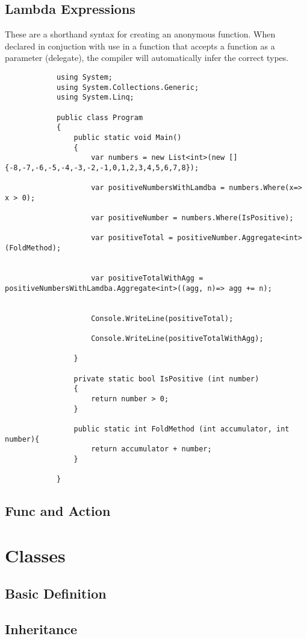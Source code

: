 \documentclass {amsart}
\begin{document}
	\subsection{Lambda Expressions}  These are a shorthand syntax for creating an anonymous function.  When declared in conjuction with use in a function that accepts a function as a parameter (delegate), the compiler will automatically infer the correct types. 
	\begin{lstlisting}
			using System;
			using System.Collections.Generic;
			using System.Linq;
			
			public class Program
			{
				public static void Main()
				{
					var numbers = new List<int>(new [] {-8,-7,-6,-5,-4,-3,-2,-1,0,1,2,3,4,5,6,7,8});
			
					var positiveNumbersWithLamdba = numbers.Where(x=> x > 0);
			
					var positiveNumber = numbers.Where(IsPositive);
					
					var positiveTotal = positiveNumber.Aggregate<int>(FoldMethod);
			
			
					var positiveTotalWithAgg = positiveNumbersWithLamdba.Aggregate<int>((agg, n)=> agg += n);
			
					
					Console.WriteLine(positiveTotal);
					
					Console.WriteLine(positiveTotalWithAgg);
					
				}
			
				private static bool IsPositive (int number)
				{
					return number > 0;
				}
				
				public static int FoldMethod (int accumulator, int number){
					return accumulator + number;	
				}
				
			}
		\end{lstlisting}


	\subsection{Func and Action}


\section{Classes}
	\subsection{Basic Definition}
	\subsection{Inheritance}
\end{document}
